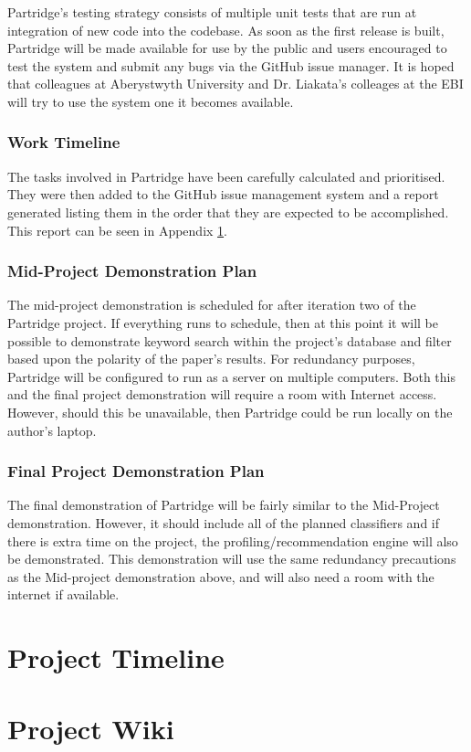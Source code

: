 \documentclass[12pt,a4paper]{article}
\begin{document}
Partridge's testing strategy consists of multiple unit tests that are run at
integration of new code into the codebase. As soon as the first release is
built, Partridge will be made available for use by the public and users
encouraged to test the system and submit any bugs via the GitHub issue manager.
It is hoped that colleagues at Aberystwyth University and Dr. Liakata's
colleages at the EBI will try to use the system one it becomes available.

\subsubsection{ Work Timeline }

The tasks involved in Partridge have been carefully calculated and prioritised.
They were then added to the GitHub issue management system and a report
generated listing them in the order that they are expected to be
accomplished. This report can be seen in Appendix \ref{sec:timeline}. 


\subsubsection{ Mid-Project Demonstration Plan}

The mid-project demonstration is scheduled for after iteration two of the
Partridge project. If everything runs to schedule, then at this point it will
be possible to demonstrate keyword search within the project's database and
filter based upon the polarity of the paper's results. For redundancy purposes,
Partridge will be configured to run as a server on multiple computers. Both
this and the final project demonstration will require a room with Internet
access. However, should this be unavailable, then Partridge could be run
locally on the author's laptop.

\subsubsection{ Final Project Demonstration Plan}

The final demonstration of Partridge will be fairly similar to the Mid-Project
demonstration. However, it should include all of the planned classifiers and if
there is extra time on the project, the profiling/recommendation engine will
also be demonstrated. This demonstration will use the same redundancy
precautions as the Mid-project demonstration above, and will also need a room
with the internet if available.

\appendix
\section{Project Timeline}
\label{sec:timeline}

\appendix
\section{Project Wiki}
\label{sec:wiki}


\pagebreak


\end{document}
